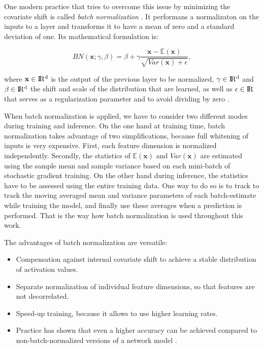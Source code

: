 One modern practice that tries to overcome this issue by minimizing the covariate shift is called \textit{batch normalization} \parencite{batchnorm}. It performans a normalizaton on the inputs to a layer and transforms it to have a mean of zero and a standard deviation of one. Its mathematical formulation is:

\begin{equation} \label{eq:bn}
  BN(\textbf{x}; \gamma, \beta) = \beta + \gamma \frac{\textbf{x} - \mathbb{E}(\textbf{x})}{\sqrt{Var(\textbf{x}) + \epsilon}} ,
\end{equation}

where $ \textbf{x} \in \rm I\!R^d $ is the output of the previous layer to be normalized, $\gamma \in \rm I\!R^d $ and $\beta \in \rm I\!R^d $ the shift and scale of the distribution that are learned, as well as $\epsilon \in \rm I\!R $ that serves as a regularization parameter and to avoid dividing by zero \parencite{rnn-batchnorm}.

When batch normalization is applied, we have to consider two different modes during training and inference. On the one hand at training time, batch normalization takes advantage of two simplifications, because full whitening of inputs is very expensive. First, each feature dimension is normalized independently. Secondly, the statistics of $ \mathbb{E}(\textbf{x}) $ and $ Var(\textbf{x}) $ are estimated using the sample mean and sample variance based on each mini-batch of stochastic gradient training. On the other hand during inference, the statistics have to be assessed using the entire training data. One way to do so is to track to track the moving averaged mean and variance parameters of each batch-estimate while training the model, and finally use these averages when a prediction is performed. That is the way how batch normalization is used throughout this work.

The advantages of batch normalization are versatile:

\begin{itemize}
\item Compensation against internal covariate shift to achieve a stable distribution of activation values.
\item Separate normalization of individual feature dimensions, so that features are not decorrelated.
\item Speed-up training, because it allows to use higher learning rates.
\item Practice has shown that even a higher accuracy can be achieved compared to non-batch-normalized versions of a network model \parencite[p. 7]{batchnorm}.
\end{itemize}



